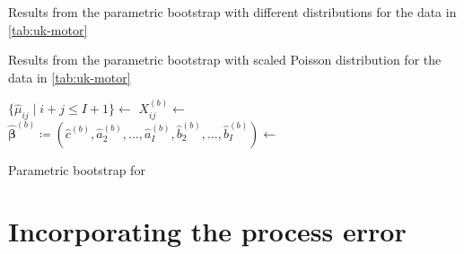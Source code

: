 \documentclass[a4paper]{book}
\begin{document}
\begin{table}[!htb]
  \centering
  \begin{subtable}{0.45\linewidth}
    
  \end{subtable}
  \hfill
  \begin{subtable}{0.45\linewidth}
    
  \end{subtable}
  \caption{Results from the parametric bootstrap with different distributions for the data in \cref{tab:uk-motor}}
  \label{tab:odp-param-norm-gamma}
\end{table}

\begin{table}[!htb]
  \centering
  
  \caption{Results from the parametric bootstrap with scaled Poisson distribution for the data in \cref{tab:uk-motor}}
  \label{tab:odp-param-pois}
\end{table}

\begin{algorithm}[!htb]
  \begin{algorithmic}
    \State $\{\widehat{\mu}_{ij} \mid i + j \leq I + 1 \} \gets$ 
          \State $X_{ij}^{(b)} \gets$ 
        \EndFor
      \EndFor
      \State $\widehat{\bm{\beta}}^{(b)} \coloneqq (\widehat{c}^{(b)}, \widehat{a}_2^{(b)}, \dots, \widehat{a}_I^{(b)}, \widehat{b}_2^{(b)}, \dots, \widehat{b}_I^{(b)}) \gets$ 
    \EndFor
    \State {}
  \end{algorithmic}
  \caption{Parametric bootstrap for }
  \label{alg:param-pois}
\end{algorithm}

\section{Incorporating the process error} \label{sec:glm-proc}
\end{document}
